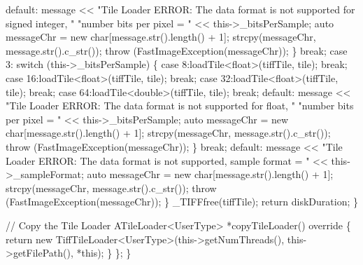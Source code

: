 \begin{DoxyCode}
          \textcolor{keywordflow}{default}:
            message << \textcolor{stringliteral}{"Tile Loader ERROR: The data format is not supported for signed integer, "}
                \textcolor{stringliteral}{"number bits per pixel = "} << this->\_bitsPerSample;
            \textcolor{keyword}{auto} messageChr = \textcolor{keyword}{new} \textcolor{keywordtype}{char}[message.str().length() + 1];
            strcpy(messageChr, message.str().c\_str());
            \textcolor{keywordflow}{throw} (FastImageException(messageChr));
        \}
        \textcolor{keywordflow}{break};
      \textcolor{keywordflow}{case} 3:
        \textcolor{keywordflow}{switch} (this->\_bitsPerSample) \{
          \textcolor{keywordflow}{case} 8:loadTile<float>(tiffTile, tile);
            \textcolor{keywordflow}{break};
          \textcolor{keywordflow}{case} 16:loadTile<float>(tiffTile, tile);
            \textcolor{keywordflow}{break};
          \textcolor{keywordflow}{case} 32:loadTile<float>(tiffTile, tile);
            \textcolor{keywordflow}{break};
          \textcolor{keywordflow}{case} 64:loadTile<double>(tiffTile, tile);
            \textcolor{keywordflow}{break};
          \textcolor{keywordflow}{default}:
            message << \textcolor{stringliteral}{"Tile Loader ERROR: The data format is not supported for float, "}
                \textcolor{stringliteral}{"number bits per pixel = "} << this->\_bitsPerSample;
            \textcolor{keyword}{auto} messageChr = \textcolor{keyword}{new} \textcolor{keywordtype}{char}[message.str().length() + 1];
            strcpy(messageChr, message.str().c\_str());
            \textcolor{keywordflow}{throw} (FastImageException(messageChr));
        \}
        \textcolor{keywordflow}{break};
      \textcolor{keywordflow}{default}:
        message << \textcolor{stringliteral}{"Tile Loader ERROR: The data format is not supported, sample format = "}
                << this->\_sampleFormat;
        \textcolor{keyword}{auto} messageChr = \textcolor{keyword}{new} \textcolor{keywordtype}{char}[message.str().length() + 1];
        strcpy(messageChr, message.str().c\_str());
        \textcolor{keywordflow}{throw} (FastImageException(messageChr));
    \}
    \_TIFFfree(tiffTile);
    \textcolor{keywordflow}{return} diskDuration;
  \}

  \textcolor{comment}{// Copy the Tile Loader}
  ATileLoader<UserType> *copyTileLoader()\textcolor{keyword}{ override }\{
    \textcolor{keywordflow}{return} \textcolor{keyword}{new} TiffTileLoader<UserType>(this->getNumThreads(), this->getFilePath(), *\textcolor{keyword}{this});
  \}
\};
\}
\end{DoxyCode}


